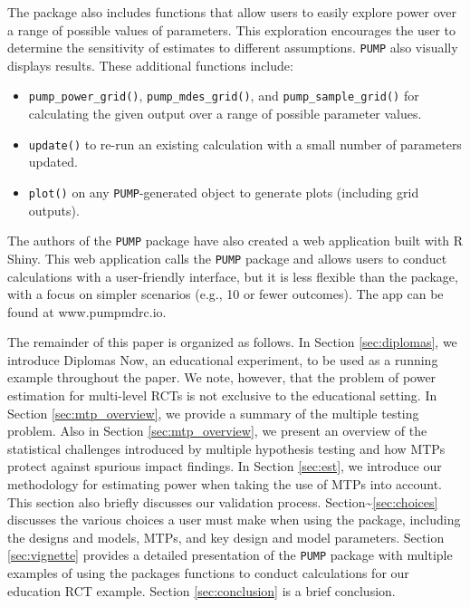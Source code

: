 \documentclass[
]{article}
\providecommand{\tightlist}{%
  \setlength{\itemsep}{0pt}\setlength{\parskip}{0pt}}
\begin{document}
The package also includes functions that allow users to easily explore
power over a range of possible values of parameters. This exploration
encourages the user to determine the sensitivity of estimates to
different assumptions. \texttt{PUMP} also visually displays results.
These additional functions include:

\begin{itemize}
\tightlist
\item
  \texttt{pump\_power\_grid()}, \texttt{pump\_mdes\_grid()}, and
  \texttt{pump\_sample\_grid()} for calculating the given output over a
  range of possible parameter values.
\item
  \texttt{update()} to re-run an existing calculation with a small
  number of parameters updated.
\item
  \texttt{plot()} on any \texttt{PUMP}-generated object to generate
  plots (including grid outputs).
\end{itemize}

The authors of the \texttt{PUMP} package have also created a web
application built with R Shiny. This web application calls the
\texttt{PUMP} package and allows users to conduct calculations with a
user-friendly interface, but it is less flexible than the package, with
a focus on simpler scenarios (e.g., 10 or fewer outcomes). The app can
be found at www.pumpmdrc.io.

The remainder of this paper is organized as follows. In Section
\ref{sec:diplomas}, we introduce Diplomas Now, an educational
experiment, to be used as a running example throughout the paper. We
note, however, that the problem of power estimation for multi-level RCTs
is not exclusive to the educational setting. In Section
\ref{sec:mtp_overview}, we provide a summary of the multiple testing
problem. Also in Section \ref{sec:mtp_overview}, we present an overview
of the statistical challenges introduced by multiple hypothesis testing
and how MTPs protect against spurious impact findings. In Section
\ref{sec:est}, we introduce our methodology for estimating power when
taking the use of MTPs into account. This section also briefly discusses
our validation process. Section\textasciitilde{}\ref{sec:choices}
discusses the various choices a user must make when using the package,
including the designs and models, MTPs, and key design and model
parameters. Section \ref{sec:vignette} provides a detailed presentation
of the \texttt{PUMP} package with multiple examples of using the
packages functions to conduct calculations for our education RCT
example. Section \ref{sec:conclusion} is a brief conclusion.
\end{document}
